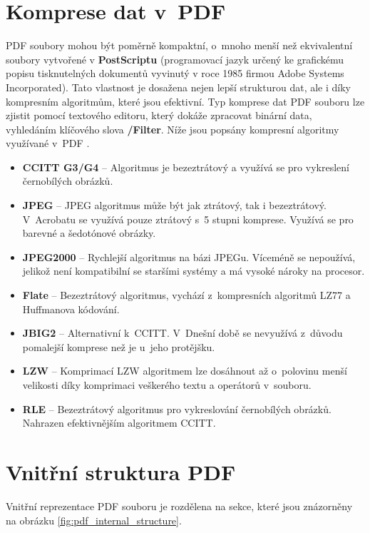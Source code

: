 \section{Komprese dat v~PDF}
\label{sec:komprese}
PDF soubory mohou být poměrně kompaktní, o~mnoho menší než ekvivalentní soubory vytvořené v \textbf{PostScriptu} (programovací jazyk určený ke grafickému popisu tisknutelných dokumentů vyvinutý v roce 1985 firmou Adobe Systems Incorporated). Tato vlastnost je dosažena nejen lepší strukturou dat, ale i díky kompresním algoritmům, které jsou efektivní. Typ komprese dat PDF souboru lze zjistit pomocí textového editoru, který dokáže zpracovat binární data, vyhledáním klíčového slova \textbf{/Filter}. Níže jsou popsány kompresní algoritmy využívané v~PDF \cite{PDFPrepressure}.
\begin{itemize}
	\item \textbf{CCITT G3/G4} -- Algoritmus je bezeztrátový a využívá se pro vykreslení černobílých obrázků.
	\item \textbf{JPEG} -- JPEG algoritmus může být jak ztrátový, tak i bezeztrátový. V~Acrobatu se využívá pouze ztrátový s~5 stupni komprese. Využívá se pro barevné a šedotónové obrázky.
	\item \textbf{JPEG2000} -- Rychlejší algoritmus na bázi JPEGu. Víceméně se nepoužívá, jelikož není kompatibilní se staršími systémy a má vysoké nároky na procesor.
	\item \textbf{Flate} -- Bezeztrátový algoritmus, vychází z~kompresních algoritmů LZ77 a Huffmanova kódování.
	\item \textbf{JBIG2} -- Alternativní k~CCITT. V~Dnešní době se nevyužívá z~důvodu pomalejší komprese než je u~jeho protějšku.
	\item \textbf{LZW} -- Komprimací LZW algoritmem lze dosáhnout až o~polovinu menší velikosti díky komprimaci veškerého textu a operátorů v~souboru.
	\item \textbf{RLE} -- Bezeztrátový algoritmus pro vykreslování černobílých obrázků. Nahrazen efektivnějším algoritmem CCITT.
\end{itemize}

\section{Vnitřní struktura PDF}
Vnitřní reprezentace PDF souboru je rozdělena na sekce, které jsou znázorněny na obrázku \ref{fig:pdf_internal_structure}.

